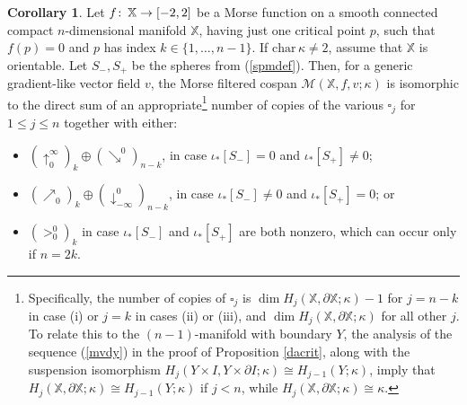 \documentclass[11pt]{amsart}
\theoremstyle{definition}
\newtheorem{cor}[theorem]{Corollary}
\theoremstyle{remark}
\numberwithin{equation}{section}
\def\co{\colon\thinspace}
\begin{document}
\begin{cor}\label{morsesummary}
Let $f\co\mathbb{X}\to [-2,2]$ be a Morse function on a smooth connected compact $n$-dimensional manifold $\mathbb{X}$, having just one critical point $p$, such that $f(p)=0$ and $p$ has index $k\in\{1,\ldots,n-1\}$. If $\mathrm{char}\,\kappa\neq 2$, assume that $\mathbb{X}$ is orientable.  Let $S_-,S_+$ be the spheres from (\ref{spmdef}). Then, for a generic gradient-like vector field $v$, the Morse filtered cospan $\mathcal{M}(\mathbb{X},f,v;\kappa)$ is isomorphic to the direct sum of an appropriate\footnote{Specifically, the number of copies of $\square_j$ is $\dim H_j(\mathbb{X},\partial\mathbb{X};\kappa)-1$ for $j=n-k$ in case (i) or $j=k$ in cases (ii) or (iii), and $\dim H_j(\mathbb{X},\partial\mathbb{X};\kappa)$ for all other $j$.  To relate this to the $(n-1)$-manifold with boundary $Y$, the analysis of the sequence (\ref{mvdy}) in the proof of Proposition \ref{dacrit}, along with the suspension isomorphism $H_j(Y\times I,Y\times \partial I;\kappa)\cong H_{j-1}(Y;\kappa)$, imply that $H_j(\mathbb{X},\partial\mathbb{X};\kappa)\cong H_{j-1}(Y;\kappa)$ if $j<n$, while $H_j(\mathbb{X},\partial\mathbb{X};\kappa)\cong\kappa$.} number of copies of the various $\square_j$ for $1\leq j\leq n$ together with either:
\begin{itemize}
	\item[(i)] $(\uparrow_{0}^{\infty})_k\oplus (\searrow^0)_{n-k}$, in case $\iota_*[S_-]=0$ and $\iota_*[S_+]\neq 0$;
	\item[(ii)] $(\nearrow_0)_k\oplus (\downarrow_{-\infty}^{0})_{n-k}$, in case $\iota_*[S_-]\neq 0$ and $\iota_*[S_+]=0$; or 
	\item[(iii)] $(>_0^0)_k$ in case $\iota_*[S_-]$ and $\iota_*[S_+]$ are both nonzero, which can occur only if $n=2k$.
\end{itemize}
\end{cor}
\end{document}
